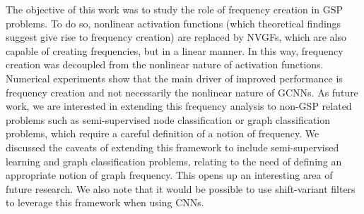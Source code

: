 

The objective of this work was to study the role of frequency creation in GSP problems. To do so, nonlinear activation functions (which theoretical findings suggest give rise to frequency creation) are replaced by NVGFs, which are also capable of creating frequencies, but in a linear manner. In this way, frequency creation was decoupled from the nonlinear nature of activation functions. Numerical experiments show that the main driver of improved performance is frequency creation and not necessarily the nonlinear nature of GCNNs. As future work, we are interested in extending this frequency analysis to non-GSP related problems such as semi-supervised node classification or graph classification problems, which require a careful definition of a notion of frequency.
\else We discussed the caveats of extending this framework to include semi-supervised learning and graph classification problems, relating to the need of defining an appropriate notion of graph frequency. This opens up an interesting area of future research. We also note that it would be possible to use shift-variant filters to leverage this framework when using CNNs.\fi